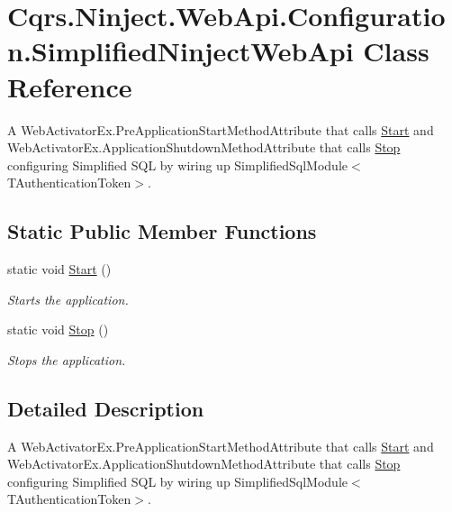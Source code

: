 \hypertarget{classCqrs_1_1Ninject_1_1WebApi_1_1Configuration_1_1SimplifiedNinjectWebApi}{}\section{Cqrs.\+Ninject.\+Web\+Api.\+Configuration.\+Simplified\+Ninject\+Web\+Api Class Reference}
\label{classCqrs_1_1Ninject_1_1WebApi_1_1Configuration_1_1SimplifiedNinjectWebApi}


A Web\+Activator\+Ex.\+Pre\+Application\+Start\+Method\+Attribute that calls \hyperlink{classCqrs_1_1Ninject_1_1WebApi_1_1Configuration_1_1SimplifiedNinjectWebApi_a7da23980ac13618949a389c0beac6e89_a7da23980ac13618949a389c0beac6e89}{Start} and Web\+Activator\+Ex.\+Application\+Shutdown\+Method\+Attribute that calls \hyperlink{classCqrs_1_1Ninject_1_1WebApi_1_1Configuration_1_1SimplifiedNinjectWebApi_a28327d1df27e02f828b52bb44319816d_a28327d1df27e02f828b52bb44319816d}{Stop} configuring Simplified S\+QL by wiring up Simplified\+Sql\+Module$<$\+T\+Authentication\+Token$>$.  


\subsection*{Static Public Member Functions}
\begin{DoxyCompactItemize}
\item 
static void \hyperlink{classCqrs_1_1Ninject_1_1WebApi_1_1Configuration_1_1SimplifiedNinjectWebApi_a7da23980ac13618949a389c0beac6e89_a7da23980ac13618949a389c0beac6e89}{Start} ()
\begin{DoxyCompactList}\small\item\em Starts the application. \end{DoxyCompactList}\item 
static void \hyperlink{classCqrs_1_1Ninject_1_1WebApi_1_1Configuration_1_1SimplifiedNinjectWebApi_a28327d1df27e02f828b52bb44319816d_a28327d1df27e02f828b52bb44319816d}{Stop} ()
\begin{DoxyCompactList}\small\item\em Stops the application. \end{DoxyCompactList}\end{DoxyCompactItemize}


\subsection{Detailed Description}
A Web\+Activator\+Ex.\+Pre\+Application\+Start\+Method\+Attribute that calls \hyperlink{classCqrs_1_1Ninject_1_1WebApi_1_1Configuration_1_1SimplifiedNinjectWebApi_a7da23980ac13618949a389c0beac6e89_a7da23980ac13618949a389c0beac6e89}{Start} and Web\+Activator\+Ex.\+Application\+Shutdown\+Method\+Attribute that calls \hyperlink{classCqrs_1_1Ninject_1_1WebApi_1_1Configuration_1_1SimplifiedNinjectWebApi_a28327d1df27e02f828b52bb44319816d_a28327d1df27e02f828b52bb44319816d}{Stop} configuring Simplified S\+QL by wiring up Simplified\+Sql\+Module$<$\+T\+Authentication\+Token$>$. 



